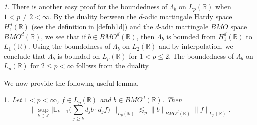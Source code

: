 \documentclass[oneside,english,a4wide]{amsart}
\numberwithin{equation}{section}
\numberwithin{figure}{section}
\theoremstyle{plain}
\theoremstyle{plain}
\theoremstyle{definition}
\theoremstyle{plain}
\newtheorem{lem}[thm]{\protect\lemmaname}
\theoremstyle{remark}
\newtheorem{rem}[thm]{\protect\remarkname}
\theoremstyle{definition}
\theoremstyle{remark}
\theoremstyle{definition}
\providecommand{\lemmaname}{Lemma}
\providecommand{\remarkname}{Remark}
\newcommand{\8}{\infty}
\begin{document}
\begin{rem}
	There is another easy proof for the boundedness of $\varLambda_b$ on $L_p(\mathbb{R})$ when $1<p\neq 2<\8$. By the duality between the $d$-adic martingale Hardy space $H^d_1(\mathbb{R})$ (see the definition in \eqref{defnh1d}) and the $d$-adic martingale $BMO$ space $BMO^d(\mathbb{R})$, we see that if $b\in BMO^d(\mathbb{R})$, then $\varLambda_b$ is bounded from $H^d_1(\mathbb{R})$ to $L_1(\mathbb{R})$. Using the boundedness of $\varLambda_b$ on $L_2(\mathbb{R})$ and by interpolation, we conclude that $\varLambda_b$ is bounded on $L_p(\mathbb{R})$ for $1<p\leq 2$. The boundedness of $\varLambda_b$ on $L_p(\mathbb{R})$ for $2\leq p<\8$ follows from the duality.
\end{rem}

We now provide the following useful lemma.
\begin{lem}\label{supk}
	Let $1<p<\infty$, $f\in L_p(\mathbb{R})$ and $b\in BMO^d(\mathbb{R})$. Then 
	\begin{equation*}
		\biggl\|\sup_{k\in\mathbb{Z}}\bigl|\mathbb{E}_{k-1}\bigl(\sum_{j\ge k} d_jb\cdot d_jf\bigr)\bigr|\biggr\|_{L_p(\mathbb{R})}\lesssim_{p} \|b\|_{BMO^d(\mathbb{R})}\|f\|_{L_p(\mathbb{R})}.
	\end{equation*}
\end{lem}
\end{document}
